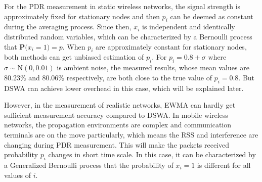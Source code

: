 \documentclass[draftclsnofoot,journal,onecolumn,11pt]{IEEEtran}
\begin{document}
For the PDR measurement in static wireless networks, the signal strength is approximately fixed for stationary nodes \cite{reis2006model} and then $p_i$ can be deemed as constant during the averaging process. Since then, $x_i$ is independent and identically distributed random variables, which can be characterized by a Bernoulli process that $\textbf{P(}x_i=1\textbf{)}=p$. When $p_i$ are approximately constant for stationary nodes, both methods can get unbiased estimation of $p_i$. For $p_i=0.8+\sigma$ where $\sigma\sim \textrm{N}(0,0.01)$ is ambient noise, the measured results, whose mean values are 80.23\% and 80.06\% respectively, are both close to the true value of $p_i=0.8$. But DSWA can achieve lower overhead in this case, which will be explained later.

However, in the measurement of realistic networks, EWMA can hardly get sufficient measurement accuracy compared to DSWA. In mobile wireless networks, the propagation environments are complex and communication terminals are on the move particularly, which means the RSS and interference are changing during PDR measurement. This will make the packets received probability $p_i$ changes in short time scale. In this case, it can be characterized by a Generalized Bernoulli process that the probability of $x_i=1$ is different for all values of $i$.
\end{document}
